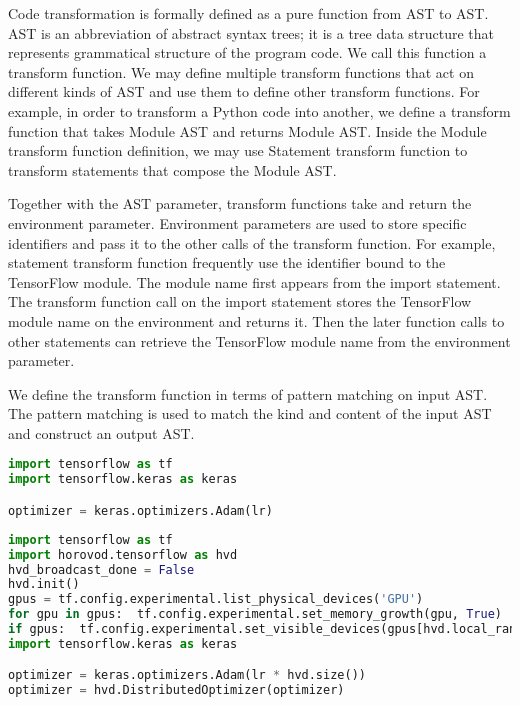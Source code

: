 Code transformation is formally defined as a pure function from AST to AST.
AST is an abbreviation of abstract syntax trees; it is a tree data structure
that represents grammatical structure of the program code.
We call this function a transform function.
We may define multiple transform functions that act on different kinds
of AST and use them to define other transform functions.
For example, in order to transform a Python code into another,
we define a transform function that takes Module AST and returns Module AST.
Inside the Module transform function definition,
we may use Statement transform function to transform statements
that compose the Module AST.

Together with the AST parameter, transform functions take and return
the environment parameter.
Environment parameters are used to store specific identifiers
and pass it to the other calls of the transform function.
For example, statement transform function frequently use 
the identifier bound to the TensorFlow module.
The module name first appears from the import statement.
The transform function call on the import statement stores
the TensorFlow module name on the environment and returns it.
Then the later function calls to other statements can
retrieve the TensorFlow module name from the environment parameter.

We define the transform function in terms of pattern matching on input AST.
The pattern matching is used to match the kind and content of the input AST
and construct an output AST.


\begin{lstlisting}[language=Python, caption = Original code example]
import tensorflow as tf
import tensorflow.keras as keras

optimizer = keras.optimizers.Adam(lr)
\end{lstlisting}

\begin{lstlisting}[language=Python, caption = Transformed code example]
import tensorflow as tf
import horovod.tensorflow as hvd
hvd_broadcast_done = False
hvd.init()
gpus = tf.config.experimental.list_physical_devices('GPU')
for gpu in gpus:  tf.config.experimental.set_memory_growth(gpu, True)
if gpus:  tf.config.experimental.set_visible_devices(gpus[hvd.local_rank()], 'GPU')
import tensorflow.keras as keras

optimizer = keras.optimizers.Adam(lr * hvd.size())
optimizer = hvd.DistributedOptimizer(optimizer)
\end{lstlisting}

